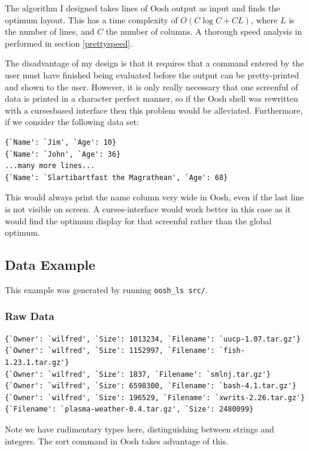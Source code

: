 \documentclass[12pt,twoside,notitlepage]{report}
\begin{document}
The algorithm I designed takes lines of Oosh output as input and finds
the optimum layout. This has a time complexity of $O(C \log C + CL)$,
where $L$ is the number of lines, and $C$ the number of columns. A
thorough speed analysis in performed in section \ref{prettyspeed}.

The disadvantage of my design is that it requires that a command
entered by the user must have finished being evaluated before the
output can be pretty-printed and shown to the user. However, it is
only really necessary that one screenful of data is printed in a
character perfect manner, so if the Oosh shell was rewritten with a
curses\footnotemark[2] based interface then this problem would be
alleviated. Furthermore, if we consider the following data set:


\begin{verbatim}
{`Name': `Jim', `Age': 10}
{`Name': `John', `Age': 36}
...many more lines...
{`Name': `Slartibartfast the Magrathean', `Age': 68}
\end{verbatim}

This would always print the name column very wide in Oosh, even if the last
line is not visible on screen. A curses-interface would work better in
this case as it would find the optimum display for that screenful
rather than the global optimum.



\subsection{Data Example}

This example was generated by running {\tt oosh\_ls src/}.

\subsubsection{Raw Data}
\label{rawdata}
\begin{verbatim}
{`Owner': `wilfred', `Size': 1013234, `Filename': `uucp-1.07.tar.gz'}
{`Owner': `wilfred', `Size': 1152997, `Filename': `fish-1.23.1.tar.gz'}
{`Owner': `wilfred', `Size': 1837, `Filename': `smlnj.tar.gz'}
{`Owner': `wilfred', `Size': 6598300, `Filename': `bash-4.1.tar.gz'}
{`Owner': `wilfred', `Size': 196529, `Filename': `xwrits-2.26.tar.gz'}
{`Filename': `plasma-weather-0.4.tar.gz', `Size': 2480099}
\end{verbatim}
Note we have rudimentary types here, distinguishing between strings and
integers. The sort command in Oosh takes advantage of this.
\end{document}
